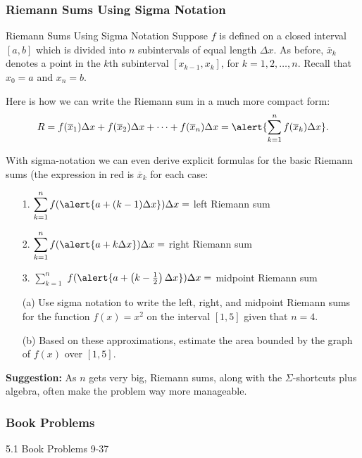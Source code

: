 \documentclass[cal1spr16Lectures.tex]{subfiles}
\begin{document}
\subsubsection{Riemann Sums Using Sigma Notation}

\begin{frame}{\small Riemann Sums Using Sigma Notation}\footnotesize
Suppose $f$ is defined on a closed interval $[a,b]$ which is divided into $n$ subintervals of equal length $\Delta x$.  As before, $\overline{x}_k$ denotes a point in the $k$th subinterval $[x_{k-1},x_k]$, for $k=1,2,\dots,n$.  Recall that $x_0=a$ and $x_n=b$. 

\vspace{1pc}
Here is how we can write the Riemann sum in a much more compact form:
\vspace{-1pc}
\[
R = f(\overline{x}_1)\Delta x + f(\overline{x}_2)\Delta x + \cdots + f(\overline{x}_n)\Delta x 
 = \alert{\sum_{k=1}^n f(\overline{x}_k) \Delta x}.
\]
\end{frame}

\begin{frame}
With sigma-notation we can even derive explicit formulas for the basic Riemann sums (the expression in \alert{red} is $\overline x_k$ for each case:

\begin{itemize}
\item[1.] $\displaystyle\sum_{k=1}^n f(\alert{a+(k-1)\Delta x}) \Delta x=$ left Riemann sum
\item[2.] $\displaystyle\sum_{k=1}^n f(\alert{a+k\Delta x}) \Delta x=$  right Riemann sum
\item[3.] $\displaystyle\sum_{k=1}^n$\hspace{-1pt} $f(\alert{a+\left(k-\frac{1}{2}\right)\Delta x}) \Delta x=$ midpoint Riemann sum
\end{itemize}
\end{frame}

\begin{frame}\small
\begin{exe} 
\begin{itemize}
\item[(a)] Use sigma notation to write the left, right, and midpoint Riemann sums for the function $f(x)=x^2$ on the interval $[1,5]$ given that $n=4$.
\item[(b)] Based on these approximations, estimate the area bounded by the graph of $f(x)$ over $[1,5]$.
\end{itemize}
\end{exe}
{\bf Suggestion:} As $n$ gets very big, Riemann sums, along with the $\Sigma$-shortcuts plus algebra, often make the problem way more manageable. 
\end{frame}

\subsubsection{Book Problems}

\begin{frame}
\begin{block}{5.1 Book Problems}
9-37
\end{block}
\end{frame}
\end{document}
